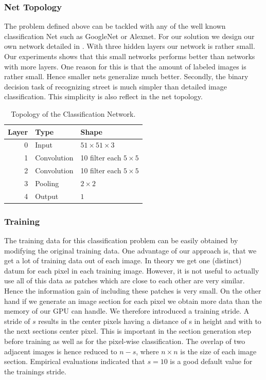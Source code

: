 \subsubsection{Net Topology}
The problem defined above can be tackled with any of the well known
classification Net such as GoogleNet or Alexnet. For our solution we design our
own network detailed in . With three hidden layers our network
is rather small. Our experiments shows that this small networks performs better
than networks with more layers. One reason for this is that the amount of
labeled images is rather small. Hence smaller nets generalize much better.
Secondly, the binary decision task of recognizing street is much simpler than
detailed image classification. This simplicity is also reflect in the net
topology.

\begin{table}[H]
	\normalsize
	\centering
\begin{tabular}{r  l l}
	\toprule
	\textbf{Layer} & \textbf{Type}  & \textbf{Shape}  \\
	\midrule
	0     & Input &  $51 \times 51 \times 3$ \\
	1     & Convolution & 10 filter  each $5 \times 5$ \\
	2     & Convolution & 10 filter  each $5 \times 5$  \\
	3     & Pooling     & $2 \times 2$ \\
	4     & Output     & $1$ \\
	\bottomrule
\end{tabular}
\caption{Topology of the Classification Network.}
\label{tab:topo}
\end{table}
\subsubsection{Training}

The training data for this classification problem can be easily obtained by modifying the original training data. One advantage of our approach is, that we get a lot of training data out of each image. In theory we get one (distinct) datum for each pixel in each training image. However, it is not useful to actually use all of this data as patches which are close to each other are very similar. Hence the information gain of including these patches is very small. On the other hand if we generate an image section for each pixel we obtain more data than the memory of our GPU can handle. We therefore introduced a training stride. A stride of $s$ results in the center pixels having a distance of s in height and with to the next sections center pixel. This is important in the section generation step before training as well as for the pixel-wise classification. The overlap of two adjacent images is hence reduced to $n-s$, where $n \times n$ is the size of each image section. Empirical evaluations indicated that $s=10$ is a good default value for the trainings stride.



